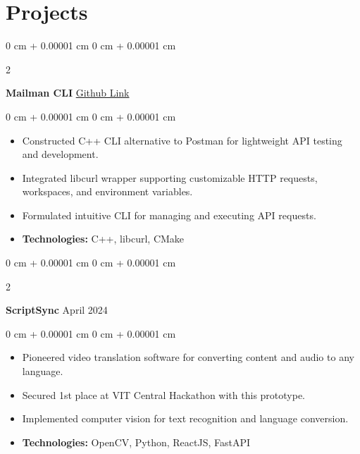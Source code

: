 \documentclass[10pt, letterpaper]{article}
\newenvironment{highlights}{
    \begin{itemize}[
        topsep=0.10 cm,
        parsep=0.10 cm,
        partopsep=0pt,
        itemsep=0pt,
        leftmargin=0 cm + 10pt
    ]
}{
    \end{itemize}
}
\newenvironment{onecolentry}{
    \begin{adjustwidth}{
        0 cm + 0.00001 cm
    }{
        0 cm + 0.00001 cm
    }
}{
    \end{adjustwidth}
}
\newenvironment{twocolentry}[2][]{
    \onecolentry
    \def\secondColumn{#2}
    \setcolumnwidth{\fill, 4.5 cm}
    \begin{paracol}{2}
}{
    \switchcolumn \raggedleft \secondColumn
    \end{paracol}
    \endonecolentry
}
\begin{document}
\section{Projects}
        
        \begin{twocolentry}{
            \href{https://github.com/anshmehta7x/mailman}{Github Link}
        }
            \textbf{Mailman CLI}\end{twocolentry}

        \vspace{0.10 cm}
        \begin{onecolentry}
            \begin{highlights}
                \item Constructed C++ CLI alternative to Postman for lightweight API testing and development.
                \item Integrated libcurl wrapper supporting customizable HTTP requests, workspaces, and environment variables.
                \item Formulated intuitive CLI for managing and executing API requests.
                \item \textbf{Technologies:} C++, libcurl, CMake
            \end{highlights}
        \end{onecolentry}

        \vspace{0.2 cm}

        \begin{twocolentry}{
            April 2024
        }
            \textbf{ScriptSync}\end{twocolentry}

        \vspace{0.10 cm}
        \begin{onecolentry}
            \begin{highlights}
                \item Pioneered video translation software for converting content and audio to any language.
                \item Secured 1st place at VIT Central Hackathon with this prototype.
                \item Implemented computer vision for text recognition and language conversion. 
                \item \textbf{Technologies:} OpenCV, Python, ReactJS, FastAPI 
            \end{highlights}
        \end{onecolentry}
\end{document}
